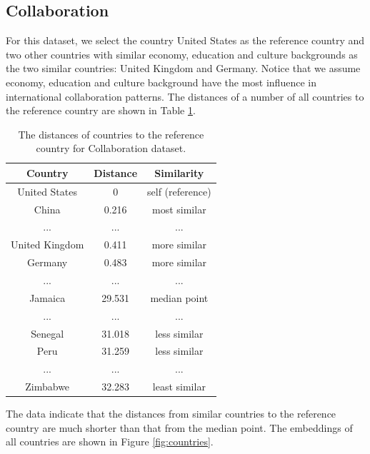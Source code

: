 \documentclass[conference]{IEEEtran}
\begin{document}
\subsection{Collaboration}
For this dataset, we select the country United States as the reference country and two other countries with similar economy, education and culture backgrounds as the two similar countries: United Kingdom and Germany.
Notice that we assume economy, education and culture background have the most influence in international collaboration patterns.
The distances of a number of all countries to the reference country are shown in Table \ref{tab:countries-distance}.
\begin{table}[!ht]
	\centering
	\caption{
		The distances of countries to the reference country for Collaboration dataset.
	}
	\begin{tabular}{ccc} \hline \rowcolor{blue!30}
		Country & Distance & Similarity \\ \hline
		United States & 0 & self (reference) \\ \hline
		China & 0.216 & most similar \\ \hline
		... & ... & ... \\ \hline
		United Kingdom & 0.411 & more similar \\ \hline
		Germany & 0.483 & more similar \\ \hline
		... & ... & ... \\ \hline
		Jamaica & 29.531 & median point \\ \hline
		... & ... & ... \\ \hline
		Senegal & 31.018 & less similar \\ \hline
		Peru & 31.259 & less similar \\ \hline
		... & ... & ... \\ \hline
		Zimbabwe & 32.283 & least similar \\ \hline
	\end{tabular}
	\label{tab:countries-distance}
\end{table}
The data indicate that the distances from similar countries to the reference country are much shorter than that from the median point.
The embeddings of all countries are shown in Figure \ref{fig:countries}.
\end{document}
